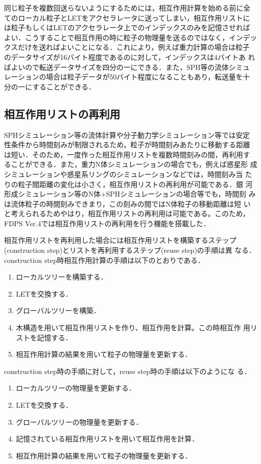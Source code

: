 \documentclass[submit]{ipsj}
\begin{document}
同じ粒子を複数回送らないようにするためには，相互作用計算を始める前に全
てのローカル粒子とLETをアクセラレータに送ってしまい，相互作用リストに
は粒子もしくはLETのアクセラレータ上でのインデックスのみを記憶させれば
よい．こうすることで相互作用の時に粒子の物理量を送るのではなく，インデッ
クスだけを送ればよいことになる．これにより，例えば重力計算の場合は粒子
のデータサイズが16バイト程度であるのに対して，インデックスは4バイトあ
ればよいので転送データサイズを四分の一にできる．また，SPH等の流体シミュ
レーションの場合は粒子データが50バイト程度になることもあり，転送量を十
分の一にすることができる．

\subsection{相互作用リストの再利用}

SPHシミュレーション等の流体計算や分子動力学シミュレーション等では安定
性条件から時間刻みが制限されるため，粒子が時間刻みあたりに移動する距離
は短い．そのため，一度作った相互作用リストを複数時間刻みの間，再利用す
ることができる．また，重力N体シミュレーションの場合でも，例えば惑星形
成シミュレーションや惑星系リングのシミュレーションなどでは，時間刻み当
たりの粒子間距離の変化は小さく，相互作用リストの再利用が可能である．銀
河形成シミュレーション等のN体+SPHシミュレーションの場合等でも，時間刻
みは流体粒子の時間刻みできまり，この刻みの間ではN体粒子の移動距離は短
いと考えられるためやはり，相互作用リストの再利用は可能である。このため，
FDPS Ver.4では相互作用リストの再利用を行う機能を搭載した．

相互作用リストを再利用した場合には相互作用リストを構築するステップ
(construction step)とリストを再利用するステップ(reuse step)の手順は異
なる．construction step時相互作用計算の手順は以下のとおりである．

\begin{enumerate}
\item ローカルツリーを構築する．
\item LETを交換する．
\item グローバルツリーを構築．
\item 木構造を用いて相互作用リストを作り、相互作用を計算。この時相互作
  用リストを記憶する．
\item 相互作用計算の結果を用いて粒子の物理量を更新する．
\end{enumerate}

construction step時の手順に対して，reuse step時の手順は以下のようにな
る．
\begin{enumerate}
\item ローカルツリーの物理量を更新する．
\item LETを交換する．
\item グローバルツリーの物理量を更新する．
\item 記憶されている相互作用リストを用いて相互作用を計算．
\item 相互作用計算の結果を用いて粒子の物理量を更新する．
\end{enumerate}
\end{document}
